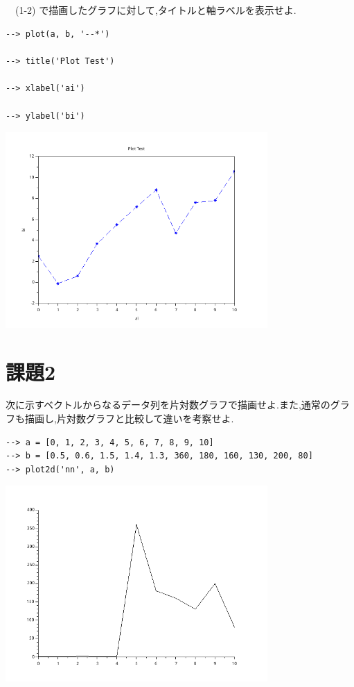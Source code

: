\documentclass[a4j, 11pt]{jarticle}
\begin{document}
\subsection{}
\label{sec:org4a21f1d}
　(1-2) で描画したグラフに対して,タイトルと軸ラベルを表示せよ.\\
\begin{verbatim}
--> plot(a, b, '--*')

--> title('Plot Test')

--> xlabel('ai')

--> ylabel('bi')
\end{verbatim}

\begin{center}
\includegraphics[width=10cm]{./1-3.png}
\end{center}
\section{課題2}
\label{sec:org7735e0d}
次に示すベクトルからなるデータ列を片対数グラフで描画せよ.また,通常のグラフも描画し,片対数グラフと比較して違いを考察せよ.\\
\begin{verbatim}
--> a = [0, 1, 2, 3, 4, 5, 6, 7, 8, 9, 10]
--> b = [0.5, 0.6, 1.5, 1.4, 1.3, 360, 180, 160, 130, 200, 80]
--> plot2d('nn', a, b)
\end{verbatim}

\begin{center}
\includegraphics[width=10cm]{./2-no-kata.png}
\end{center}
\end{document}
